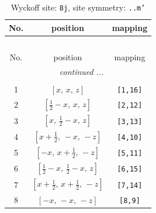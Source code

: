 \documentclass[fleqn,8pt]{jsarticle}
\begin{document}
\begin{longtable}{ccc}
\caption{Wyckoff site: {\tt 8j}, site symmetry: {\tt ..m'}}
 \\
 \hline \hline
No. & position & mapping \\ \hline \endfirsthead

\multicolumn{2}{l}{\tablename\ \thetable{}} \\
 \hline \hline
No. & position & mapping \\ \hline \endhead

 \hline \hline
\multicolumn{2}{r}{\footnotesize\it continued ...} \\ \endfoot

 \hline \hline
\multicolumn{2}{r}{} \\ \endlastfoot

1 & $\left[ x,\, x,\, z \right]$ & {\tt [1,16]} \\ \hline
2 & $\left[ \frac{1}{2} - x,\, x,\, z \right]$ & {\tt [2,12]} \\ \hline
3 & $\left[ x,\, \frac{1}{2} - x,\, z \right]$ & {\tt [3,13]} \\ \hline
4 & $\left[ x + \frac{1}{2},\, - x,\, - z \right]$ & {\tt [4,10]} \\ \hline
5 & $\left[ - x,\, x + \frac{1}{2},\, - z \right]$ & {\tt [5,11]} \\ \hline
6 & $\left[ \frac{1}{2} - x,\, \frac{1}{2} - x,\, z \right]$ & {\tt [6,15]} \\ \hline
7 & $\left[ x + \frac{1}{2},\, x + \frac{1}{2},\, - z \right]$ & {\tt [7,14]} \\ \hline
8 & $\left[ - x,\, - x,\, - z \right]$ & {\tt [8,9]} \\
\end{longtable}
\renewcommand{\arraystretch}{1.2}
\end{document}

